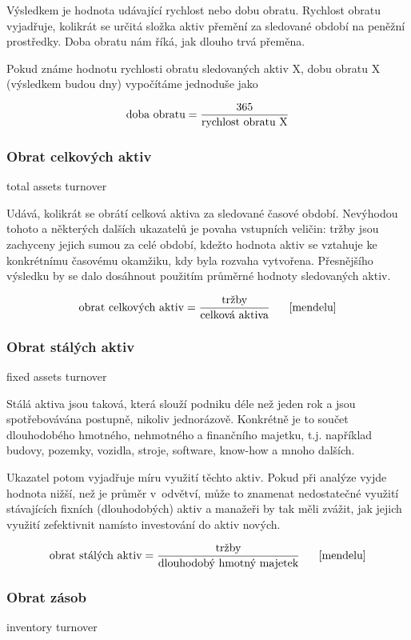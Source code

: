 Výsledkem je hodnota udávající rychlost nebo dobu obratu. Rychlost obratu vyjadřuje, kolikrát se určitá složka aktiv přemění za sledované období na peněžní prostředky. Doba obratu nám říká, jak dlouho trvá přeměna.

Pokud známe hodnotu rychlosti obratu sledovaných aktiv X, dobu obratu X (výsledkem budou dny) vypočítáme jednoduše jako 

$$\text{doba obratu} = \dfrac{\text{365}}{\text{rychlost obratu X}}$$

\subsubsection{Obrat celkových aktiv}
total assets turnover

Udává, kolikrát se obrátí celková aktiva za sledované časové období. Nevýhodou tohoto a některých dalších ukazatelů je povaha vstupních veličin: tržby jsou zachyceny jejich sumou za celé období, kdežto hodnota aktiv se vztahuje ke konkrétnímu časovému okamžiku, kdy byla rozvaha vytvořena. Přesnějšího výsledku by se dalo dosáhnout použitím průměrné hodnoty sledovaných aktiv. 

$$\vz{obrat celkových aktiv}{tržby}{celková aktiva} \scite{mendelu}$$

\subsubsection{Obrat stálých aktiv}
fixed assets turnover

Stálá aktiva jsou taková, která slouží podniku déle než jeden rok a jsou spotřebovávána postupně, nikoliv jednorázově. Konkrétně je to součet dlouhodobého hmotného, nehmotného a finančního majetku, t.j. například budovy, pozemky, vozidla, stroje, software, know-how a mnoho dalších.

Ukazatel potom vyjadřuje míru využití těchto aktiv. Pokud při analýze vyjde hodnota nižší, než je průměr v~odvětví, může to znamenat nedostatečné využití stávajících fixních (dlouhodobých) aktiv a manažeři by tak měli zvážit, jak jejich využití zefektivnit namísto investování do aktiv nových.

$$\vz{obrat stálých aktiv}{tržby}{dlouhodobý hmotný majetek} \scite{mendelu}$$

\subsubsection{Obrat zásob}
inventory turnover

